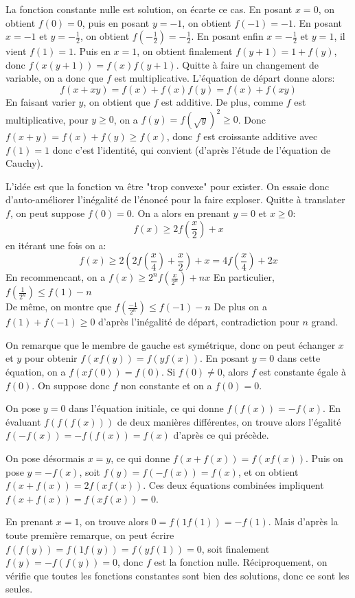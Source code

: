 \begin{sol}
La fonction constante nulle est solution, on écarte ce cas. En posant $x=0$, on obtient $f(0)=0$, puis en posant $y=-1$, on obtient $f(-1)=-1$. En posant $x=-1$ et $y=-\displaystyle\frac{1}{2}$, on obtient $f\left(-\displaystyle\frac{1}{2}\right)=-\displaystyle\frac{1}{2}$. En posant enfin $x=-\displaystyle\frac{1}{2}$ et $y=1$, il vient $f(1)=1$. Puis en $x=1$, on obtient finalement $f(y+1)=1+f(y)$, donc $f(x(y+1))=f(x)f(y+1)$. Quitte à faire un changement de variable, on a donc que $f$ est multiplicative. L'équation de départ donne alors:
$$f(x+xy)=f(x)+f(x)f(y)=f(x)+f(xy)$$
En faisant varier $y$, on obtient que $f$ est additive. De plus, comme $f$ est multiplicative, pour $y\ge 0$, on a $f(y)=f(\sqrt{y})^2\ge 0$. Donc $f(x+y)=f(x)+f(y)\ge f(x)$, donc $f$ est croissante additive avec $f(1)=1$ donc c'est l'identité, qui convient (d'après l'étude de l'équation de Cauchy).
\end{sol}


\begin{sol}
L'idée est que la fonction va être "trop convexe" pour exister. On essaie donc d'auto-améliorer l'inégalité de l'énoncé pour la faire exploser.
Quitte à translater $f$, on peut suppose $f(0)=0$. On a alors en prenant $y=0$ et $x\ge 0$:
$$f(x)\ge 2f\left(\frac{x}{2}\right)+x$$
en itérant une fois on a:
$$f(x)\ge 2\left(2f\left(\frac{x}{4}\right)+\frac{x}{2}\right)+x=4f\left(\frac{x}{4}\right)+2x$$
En recommencant, on a $f(x)\ge 2^n f\left(\displaystyle\frac{x}{2^n}\right)+nx$
En particulier, $f\left(\displaystyle\frac{1}{2^n}\right)\le f(1)-n$\\
De même, on montre que $f\left(\displaystyle\frac{-1}{2^n}\right)\le f(-1)-n$
De plus on a $f(1)+f(-1)\ge 0$ d'après l'inégalité de départ, contradiction pour $n$ grand.
\end{sol}

\begin{sol}
On remarque que le membre de gauche est symétrique, donc on peut échanger $x$ et $y$ pour obtenir $f(xf(y))=f(yf(x))$. En posant $y=0$ dans cette équation, on a $f(xf(0))=f(0)$. Si $f(0)\neq 0$, alors $f$ est constante égale à $f(0)$. On suppose donc $f$ non constante et on a $f(0)=0$.

On pose $y=0$ dans l'équation initiale, ce qui donne $f(f(x))=-f(x)$. En évaluant $f(f(f(x)))$ de deux manières différentes, on trouve alors l'égalité $f(-f(x))=-f(f(x))=f(x)$ d'après ce qui précède.

On pose désormais $x=y$, ce qui donne $f(x+f(x))=f(xf(x))$. Puis on pose $y=-f(x)$, soit $f(y)=f(-f(x))=f(x)$, et on obtient $f(x+f(x))=2f(xf(x))$. Ces deux équations combinées impliquent $f(x+f(x))=f(xf(x))=0$.

En prenant $x=1$, on trouve alors $0=f(1f(1))=-f(1)$. Mais d'après la toute première remarque, on peut écrire $f(f(y))=f(1f(y))=f(yf(1))=0$, soit finalement $f(y)=-f(f(y))=0$, donc $f$ est la fonction nulle. Réciproquement, on vérifie que toutes les fonctions constantes sont bien des solutions, donc ce sont les seules.
\end{sol}


